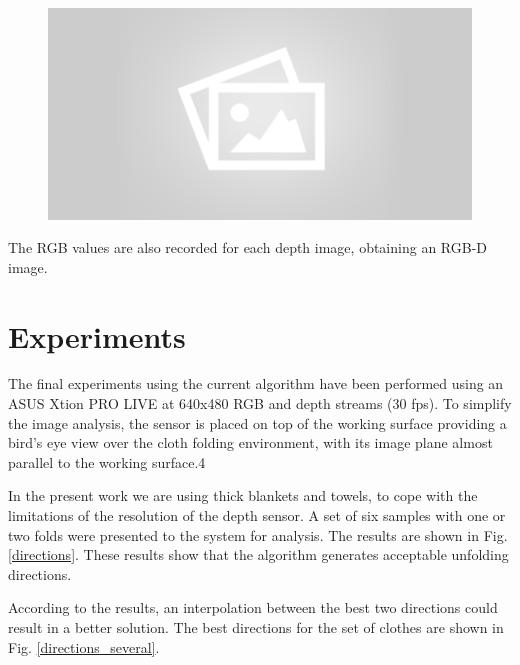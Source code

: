 \begin{figure}[thpb]
    \centering
    \includegraphics[width=0.7
    \textwidth]{figures/placeholder2.png}
    \caption{}
    \label{fig:point_cloud_and_depth_image}
\end{figure}

The RGB values are also recorded for each depth image, obtaining an RGB-D image.

\section{Experiments }
\label{experiments:experiments}

The final experiments using the current algorithm have been performed using an ASUS Xtion PRO LIVE at 640x480 RGB and depth streams (30 fps).
To simplify the image analysis, the sensor is placed on top of the working surface  providing a bird's eye view over the cloth folding environment, with its image plane almost parallel to the working surface.4

In the present work we are using thick blankets and towels, to cope with the limitations of the resolution of the depth sensor. A set of six samples with one or two folds were presented to the system for analysis. The results are shown in Fig. \ref{directions}.
%
These results show that the algorithm generates acceptable unfolding directions.




According to the results, an interpolation between the best two directions could result in a better solution. The best directions for the set of clothes are shown in Fig. \ref{directions_several}. %

